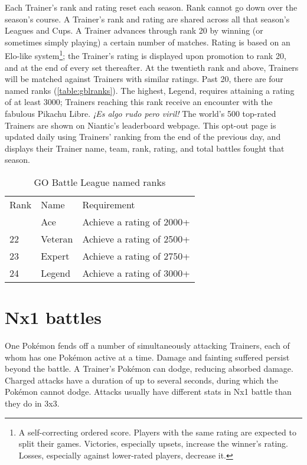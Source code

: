 Each Trainer's rank and rating reset each season.
Rank cannot go down over the season's course.
A Trainer's rank and rating are shared across all that season's Leagues and Cups.
A Trainer advances through rank 20 by winning (or sometimes simply playing) a certain number of matches.
Rating is based on an Elo-like system\footnote{A self-correcting ordered score.
Players with the same rating are expected to split their games.
Victories, especially upsets, increase the winner's rating.
Losses, especially against lower-rated players, decrease it.}; the Trainer's rating is displayed upon promotion to rank 20, and at the end of every set thereafter.
At the twentieth rank and above, Trainers will be matched against Trainers with similar ratings.
Past 20, there are four named ranks (\autoref{table:gblranks}).
The highest, Legend, requires attaining a rating of at least 3000;
 Trainers reaching this rank receive an encounter with the
 fabulous Pikachu Libre. \textit{¡Es algo rudo pero viril!}
The world's 500 top-rated Trainers are shown on Niantic's leaderboard webpage.
This opt-out page is updated daily using Trainers' ranking from the end of the previous day,
 and displays their Trainer name, team, rank, rating, and total battles fought that season.
\begin{table}
\centering
\begin{tabular}{lll}
Rank & Name & Requirement\\
\Midrule
  21 & Ace & Achieve a rating of 2000+\\
  22 & Veteran & Achieve a rating of 2500+\\
  23 & Expert & Achieve a rating of 2750+\\
  24 & Legend & Achieve a rating of 3000+\\
\end{tabular}
  \caption{GO Battle League named ranks\label{table:gblranks}}
\end{table}

\section{Nx1 battles\label{sec:nx1}}
One Pokémon fends off a number of simultaneously attacking Trainers, each of whom has one Pokémon active at a time.
Damage and fainting suffered persist beyond the battle.
A Trainer's Pokémon can dodge, reducing absorbed damage.
Charged attacks have a duration of up to several seconds, during which the Pokémon cannot dodge.
Attacks usually have different stats in Nx1 battle than they do in 3x3.

